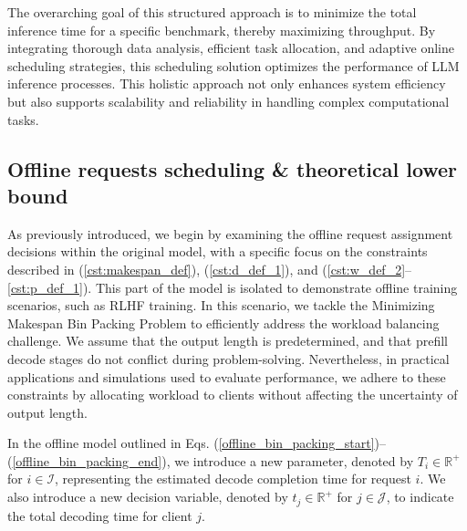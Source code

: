 
The overarching goal of this structured approach is to minimize the total inference time for a specific benchmark, thereby maximizing throughput. By integrating thorough data analysis, efficient task allocation, and adaptive online scheduling strategies, this scheduling solution optimizes the performance of LLM inference processes. This holistic approach not only enhances system efficiency but also supports scalability and reliability in handling complex computational tasks.



\subsection{Offline requests scheduling \& theoretical lower bound}
As previously introduced, we begin by examining the offline request assignment decisions within the original model, with a specific focus on the constraints described in (\ref{cst:makespan_def}), (\ref{cst:d_def_1}), and (\ref{cst:w_def_2}--\ref{cst:p_def_1}). This part of the model is isolated to demonstrate offline training scenarios, such as RLHF training. In this scenario, we tackle the Minimizing Makespan Bin Packing Problem to efficiently address the workload balancing challenge. We assume that the output length is predetermined, and that prefill decode stages do not conflict during problem-solving. Nevertheless, in practical applications and simulations used to evaluate performance, we adhere to these constraints by allocating workload to clients without affecting the uncertainty of output length.

In the offline model outlined in Eqs. (\ref{offline_bin_packing_start})--(\ref{offline_bin_packing_end}), we introduce a new parameter, denoted by $T_i \in \mathbb{R}^+$ for $i\in \mathcal{I}$, representing the estimated decode completion time for request $i$. We also introduce a new decision variable, denoted by $t_j \in \mathbb{R}^+$ for $j\in \mathcal{J}$, to indicate the total decoding time for client $j$.

